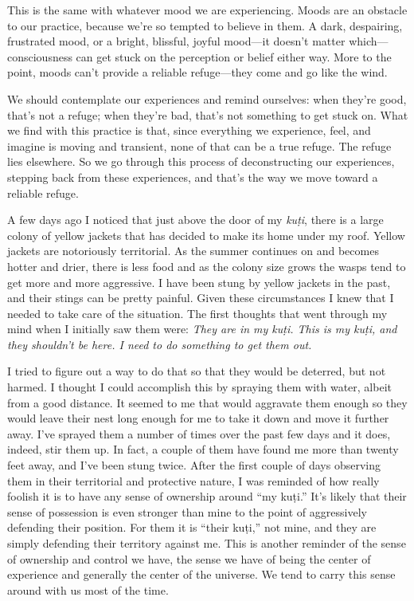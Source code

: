 This is the same with whatever mood we are experiencing. Moods are an 
obstacle to our practice, because we're so tempted to believe in them. 
A dark, despairing, frustrated mood, or a bright, blissful, joyful 
mood---it doesn't matter which---consciousness can get stuck on the 
perception or belief either way. More to the point, moods can't provide 
a reliable refuge---they come and go like the wind.

We should contemplate our experiences and remind ourselves: when 
they're good, that's not a refuge; when they're bad, that's not 
something to get stuck on. What we find with this practice is that, 
since everything we experience, feel, and imagine is moving and 
transient, none of that can be a true refuge. The refuge lies 
elsewhere. So we go through this process of deconstructing our 
experiences, stepping back from these experiences, and that's the way 
we move toward a reliable refuge.


A few days ago I noticed that just above the door of my \emph{kuṭi}, 
there is a large colony of yellow jackets that has decided to make its 
home under my roof. Yellow jackets are notoriously territorial. As the 
summer continues on and becomes hotter and drier, there is less food 
and as the colony size grows the wasps tend to get more and more 
aggressive. I have been stung by yellow jackets in the past, and their 
stings can be pretty painful. Given these circumstances I knew that I 
needed to take care of the situation. The first thoughts that went 
through my mind when I initially saw them were: \emph{They are in my 
kuṭi. This is my kuṭi, and they shouldn't be here. I need to do 
something to get them out.}

I tried to figure out a way to do that so that they would be deterred, 
but not harmed. I thought I could accomplish this by spraying them with 
water, albeit from a good distance. It seemed to me that would 
aggravate them enough so they would leave their nest long enough for me 
to take it down and move it further away. I've sprayed them a number of 
times over the past few days and it does, indeed, stir them up. In 
fact, a couple of them have found me more than twenty feet away, and 
I've been stung twice. After the first couple of days observing them in 
their territorial and protective nature, I was reminded of how really 
foolish it is to have any sense of ownership around ``my kuṭi.'' It's 
likely that their sense of possession is even stronger than mine to the 
point of aggressively defending their position. For them it is ``their 
kuṭi,'' not mine, and they are simply defending their territory 
against me. This is another reminder of the sense of ownership and 
control we have, the sense we have of being the center of experience 
and generally the center of the universe. We tend to carry this sense 
around with us most of the time.

